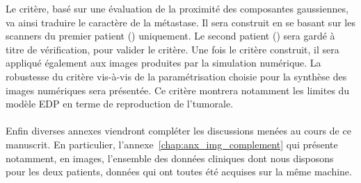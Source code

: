 \documentclass[main.tex]{subfiles}
\begin{document}
Le critère, basé sur une évaluation de la proximité des %
composantes gaussiennes, va ainsi traduire le caractère \heterogene de la métastase. 
Il sera construit en se basant sur les scanners du premier patient (\Nber) uniquement. 
Le second patient (\Chen) sera gardé à titre de vérification, pour valider le critère. 
Une fois le critère construit, il sera appliqué également aux images produites par la simulation numérique. 
La robustesse du critère vis-à-vis de la paramétrisation choisie pour la synthèse des images  numériques sera présentée. 
Ce critère montrera notamment les limites du modèle EDP en terme de reproduction de l'\hetero tumorale.

\paragraph{}
Enfin diverses annexes viendront compléter les discussions menées au cours de ce manuscrit. En particulier, %
l'annexe~\ref{chap:anx_img_complement} qui présente notamment, en images, l'ensemble des données cliniques dont nous disposons pour les deux patients, données qui ont toutes été acquises sur la même machine. 
\end{document}
